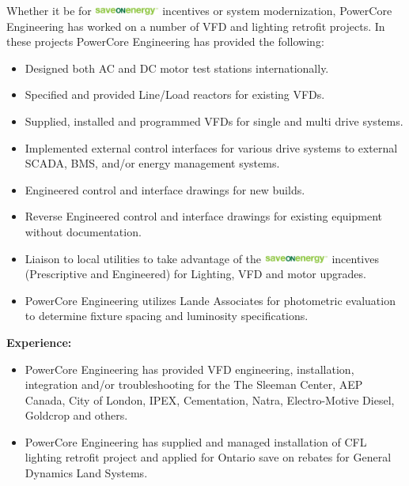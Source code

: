 Whether it be for \includegraphics[height=0.1in]{../Images/SOE.png} incentives or system modernization, PowerCore Engineering has worked on a number of  VFD and lighting retrofit projects. In these projects PowerCore Engineering has provided the following: 
\begin{itemize}
	\item Designed both AC and DC motor test stations internationally. 
	\item Specified and provided Line/Load reactors for existing VFDs.
	\item Supplied, installed and programmed VFDs for single and multi drive systems.
	\item Implemented external control interfaces for various drive systems to external SCADA, BMS, and/or energy management systems.
	\item Engineered control and interface drawings for new builds.
	\item Reverse Engineered control and interface drawings for existing equipment without documentation.
	\item Liaison to local utilities to take advantage of the \includegraphics[height=0.1in]{../Images/SOE.png} incentives (Prescriptive and Engineered) for Lighting, VFD and motor upgrades.
	\item PowerCore Engineering utilizes Lande Associates for photometric evaluation to determine fixture spacing and luminosity specifications.
\end{itemize}

\vspace{10 mm}
\noindent \textbf{Experience:}	

\begin{itemize}
	\item PowerCore Engineering has provided VFD engineering, installation, integration and/or troubleshooting for the The Sleeman Center, AEP Canada, City of London, IPEX, Cementation, Natra, Electro-Motive Diesel, Goldcrop and others.
	\item PowerCore Engineering has supplied and managed installation of CFL lighting retrofit project and applied for Ontario save on rebates for General Dynamics Land Systems.

\end{itemize}

